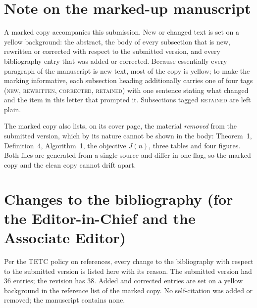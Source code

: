 \documentclass[11pt,a4paper]{article}
\begin{document}
\section{Note on the marked-up manuscript}

A marked copy accompanies this submission. New or changed text is set on a
yellow background: the abstract, the body of every subsection that is new,
rewritten or corrected with respect to the submitted version, and every
bibliography entry that was added or corrected. Because essentially every
paragraph of the manuscript is new text, most of the copy is yellow; to make
the marking informative, each subsection heading additionally carries one of
four tags (\textsc{new}, \textsc{rewritten}, \textsc{corrected},
\textsc{retained}) with one sentence stating what changed and the item in this
letter that prompted it. Subsections tagged \textsc{retained} are left plain.

The marked copy also lists, on its cover page, the material \emph{removed} from
the submitted version, which by its nature cannot be shown in the body:
Theorem~1, Definition~4, Algorithm~1, the objective $J(n)$, three tables and
four figures. Both files are generated from a single source and differ in one
flag, so the marked copy and the clean copy cannot drift apart.

\section{Changes to the bibliography (for the Editor-in-Chief and the Associate Editor)}

Per the TETC policy on references, every change to the bibliography with
respect to the submitted version is listed here with its reason. The submitted
version had $36$ entries; the revision has $38$. Added and corrected entries
are set on a yellow background in the reference list of the marked copy. No
self-citation was added or removed; the manuscript contains none.
\end{document}
